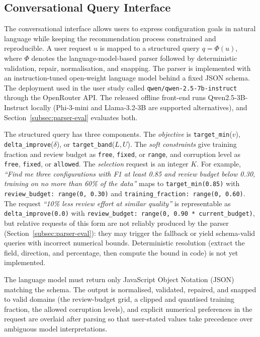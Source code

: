 \documentclass[final,5p,times,twocolumn]{elsarticle}
\begin{document}
\subsection{Conversational Query Interface}
\label{subsec:interface}

The conversational interface allows users to express configuration
goals in natural language while keeping the recommendation process
constrained and reproducible. A user request $u$ is mapped to a
structured query $q = \Phi(u)$, where $\Phi$ denotes the
language-model-based parser followed by deterministic validation,
repair, normalisation, and snapping. The parser is implemented with an
instruction-tuned open-weight language model behind a fixed JSON schema.
The deployment used in the user study called
\texttt{qwen/qwen-2.5-7b-instruct} through the OpenRouter API. The released offline front-end runs Qwen2.5-3B-Instruct locally (Phi-3-mini
and Llama-3.2-3B are supported alternatives), and
Section~\ref{subsec:parser-eval} evaluates both.

The structured query has three components. The \emph{objective} is
\texttt{target\_min}($v$), \texttt{delta\_improve}($\delta$), or
\texttt{target\_band}($L,U$). The \emph{soft constraints} give
training fraction and review budget as \texttt{free},
\texttt{fixed}, or \texttt{range}, and corruption level as
\texttt{free}, \texttt{fixed}, or \texttt{allowed}. The
\emph{selection} request is an integer $K$. For example, \emph{``Find me three configurations with F1 at least 0.85
and review budget below 0.30, training on no more than 60\% of the
data''} maps to \texttt{target\_min(0.85)} with
\texttt{review\_budget: range(0, 0.30)} and
\texttt{training\_fraction: range(0, 0.60)}. The request \emph{``10\% less review
effort at similar quality''} is representable as
\texttt{delta\_improve(0.0)} with \texttt{review\_budget: range(0,
0.90\,*\,current\_budget)}, but relative requests of this form are not reliably produced by the parser (Section~\ref{subsec:parser-eval}): they may trigger the fallback or yield schema-valid queries with incorrect numerical bounds. Deterministic resolution (extract the field, direction, and percentage, then compute the bound in code) is not yet implemented.

The language model must return only JavaScript Object Notation (JSON)
matching the schema. The output is normalised, validated, repaired, and
snapped to valid domains (the review-budget grid, a clipped and
quantised training fraction, the allowed corruption levels), and
explicit numerical preferences in the request are overlaid after
parsing so that user-stated values take precedence over ambiguous
model interpretations.
\end{document}

